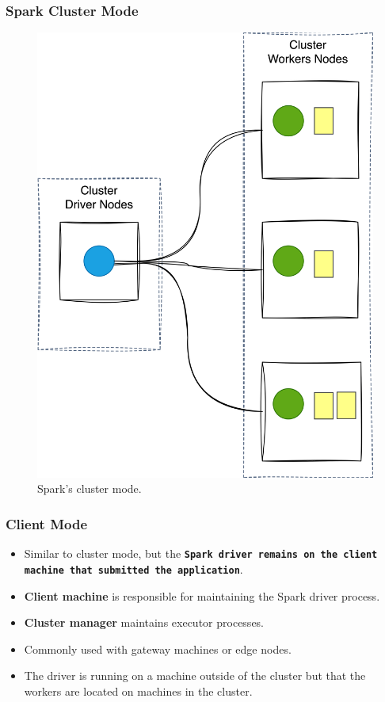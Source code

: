 \begin{frame}
    \frametitle{Spark Cluster Mode}
    \begin{figure}
        \includegraphics[width=\textwidth,height=.7\textheight,keepaspectratio]{./Figures/chapter-04/spark_cluster_mode}
        \caption{Spark’s cluster mode.}\label{fig:cluster_mode}
    \end{figure}
\end{frame}

\begin{frame}
    \frametitle{Client Mode}
    \begin{itemize}
        \item Similar to cluster mode, but the  \textbf{\texttt{Spark driver remains on the client
        machine that submitted the application}}.
        \item \textbf{Client machine} is responsible for maintaining the Spark driver process.
        \item \textbf{Cluster manager} maintains executor processes.
        \item Commonly used with gateway machines or edge nodes.
        \item The driver is running on a machine outside of the cluster but that the workers are located on machines in the cluster.
    \end{itemize}
\end{frame}

